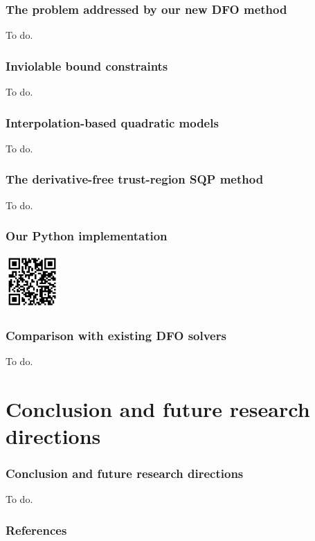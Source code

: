 \documentclass{polyu-presentation}
\begin{document}
\begin{frame}
    \frametitle{The problem addressed by our new DFO method}
    
	To do.
\end{frame}

\begin{frame}
    \frametitle{Inviolable bound constraints}
    
	To do.
\end{frame}

\begin{frame}
    \frametitle{Interpolation-based quadratic models}
    
	To do.
\end{frame}

\begin{frame}
    \frametitle{The derivative-free trust-region SQP method}
    
	To do.
\end{frame}

\begin{frame}
    \frametitle{Our Python implementation}
    
	\begin{center}
        \includegraphics[width=0.8in]{images/qr/cobyqa.png}
    \end{center}
\end{frame}

\begin{frame}
    \frametitle{Comparison with existing DFO solvers}
    
	To do.
\end{frame}

\section{Conclusion and future research directions}

\begin{frame}
    \frametitle{Conclusion and future research directions}

	To do.
\end{frame}

\appendix

\begin{frame}[t,allowframebreaks]
    \frametitle{References}

	\printbibliography
\end{frame}
\end{document}
